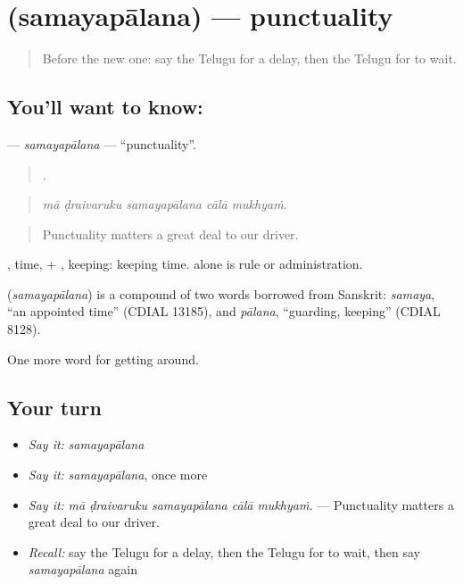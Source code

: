 \section[\texorpdfstring{\te{సమయపాలన} (samayapālana)}{సమయపాలన (samayapālana)}]{ (samayapālana) — punctuality}

\label{lesson:TE-C440-samayapalana}



\begin{quote}
Before the new one: say the Telugu for a delay, then the Telugu for to wait.
\end{quote}

\subsection*{You'll want to know: }
\textbf{} — \emph{samayapālana} — \textquotedblleft{}punctuality\textquotedblright{}.

\begin{quote}
    .
\end{quote}

\begin{quote}
\emph{mā ḍraivaruku samayapālana cālā mukhyaṁ.}
\end{quote}

\begin{quote}
Punctuality matters a great deal to our driver.
\end{quote}

, time, + , keeping: keeping time.  alone is rule or administration.

\begin{cousinweb}
\textbf{} (\emph{samayapālana}) is a compound of two words borrowed from Sanskrit: \emph{samaya}, \textquotedblleft{}an appointed time\textquotedblright{} (CDIAL 13185), and \emph{pālana}, \textquotedblleft{}guarding, keeping\textquotedblright{} (CDIAL 8128).
\end{cousinweb}

\begin{grammarlens}[title={What you've built}]
One more word for getting around.
\end{grammarlens}

\subsection*{Your turn}
\begin{itemize}
\raggedright
  \item \emph{Say it:} \emph{samayapālana}
  \item \emph{Say it:} \emph{samayapālana}, once more
  \item \emph{Say it:} \emph{mā ḍraivaruku samayapālana cālā mukhyaṁ.} — Punctuality matters a great deal to our driver.
  \item \emph{Recall:} say the Telugu for a delay, then the Telugu for to wait, then say \emph{samayapālana} again
\end{itemize}

